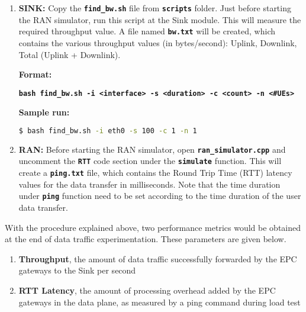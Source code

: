 \pdfminorversion=4\documentclass[hidelinks]{report}
\newcommand{\cf}[1] {
	\textbf{\texttt{#1}}
}
\begin{document}
\begin{enumerate}

\item \textbf{SINK:} Copy the \cf{find\_bw.sh} file from \cf{scripts} folder. Just before starting the RAN simulator, run this script at the Sink module. This will measure the required throughput value. A file named \cf{bw.txt} will be created, which contains the various throughput values (in bytes/second): Uplink, Downlink, Total (Uplink + Downlink). 

\textbf{Format:}
\begin{center}

\cf{bash find\_bw.sh -i <interface> -s <duration> -c <count> -n <\#UEs>} 

\end{center}

\textbf{Sample run:}

\begin{lstlisting}[language=bash]
$ bash find_bw.sh -i eth0 -s 100 -c 1 -n 1
\end{lstlisting}

\item \textbf{RAN:} Before starting the RAN simulator, open \cf{ran\_simulator.cpp} and uncomment the \cf{RTT} code section under the \cf{simulate} function. This will create a \cf{ping.txt} file, which contains the Round Trip Time (RTT) latency values for the data transfer in milliseconds. Note that the time duration under \cf{ping} function need to be set according to the time duration of the user data transfer.

\end{enumerate}

With the procedure explained above, two performance metrics would be obtained at the end of data traffic experimentation. These parameters are given below.

\begin{enumerate}

\item \textbf{Throughput}, the amount of data traffic successfully forwarded by the EPC gateways to the Sink per second

\item \textbf{RTT Latency}, the amount of processing overhead added by the EPC gateways in the data
plane, as measured by a ping command during load test

\end{enumerate}
\end{document}
